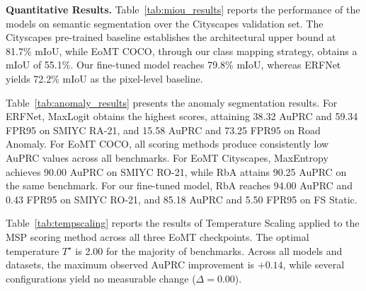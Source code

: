 \documentclass[10pt,twocolumn,letterpaper]{article}
\begin{document}
\textbf{Quantitative Results.}
Table~\ref{tab:miou_results} reports the performance of the models on 
semantic segmentation over the Cityscapes validation set. The Cityscapes 
pre-trained baseline establishes the architectural upper bound at 81.7\% 
mIoU, while EoMT COCO, through our class mapping strategy, obtains a 
mIoU of 55.1\%. Our fine-tuned model reaches 79.8\% mIoU, whereas 
ERFNet yields 72.2\% mIoU as the pixel-level baseline.

\begin{table}[h]
\caption{Semantic Segmentation Performance (mIoU) on the Cityscapes Validation Set.}
\label{tab:miou_results}
\begin{center}
\end{center}
\end{table}

Table~\ref{tab:anomaly_results} presents the anomaly segmentation results. 
For ERFNet, MaxLogit obtains the highest scores, attaining 38.32 AuPRC 
and 59.34 FPR95 on SMIYC RA-21, and 15.58 AuPRC and 73.25 FPR95 
on Road Anomaly. For EoMT COCO, all scoring methods produce 
consistently low AuPRC values across all benchmarks. For EoMT 
Cityscapes, MaxEntropy achieves 90.00 AuPRC on SMIYC RO-21, while 
RbA attains 90.25 AuPRC on the same benchmark. For our fine-tuned 
model, RbA reaches 94.00 AuPRC and 0.43 FPR95 on SMIYC RO-21, 
and 85.18 AuPRC and 5.50 FPR95 on FS Static.

Table~\ref{tab:tempscaling} reports the results of Temperature Scaling applied to the MSP scoring method across all three EoMT checkpoints. The optimal temperature $T^\star$ is 2.00 for the majority of benchmarks. Across all models and datasets, the maximum observed AuPRC improvement is $+0.14$, while several configurations yield no measurable change ($\Delta = 0.00$).
\end{document}
